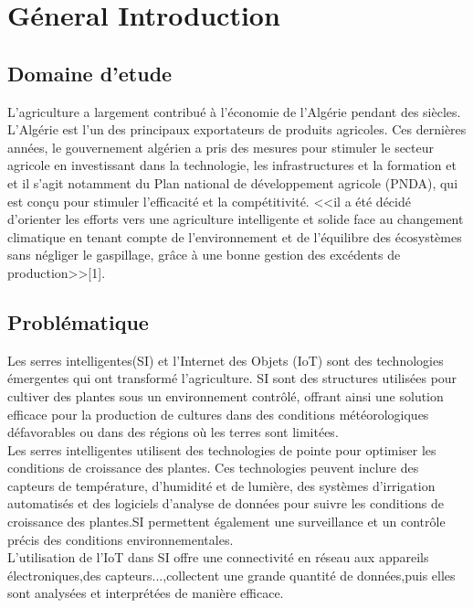 \chapter*{Géneral Introduction} 
\label{chap:introduction} 


\section*{Domaine d'etude}

L'agriculture a largement contribué à l'économie de l'Algérie pendant des siècles. L'Algérie est l'un des principaux exportateurs de produits agricoles.
Ces dernières années, le gouvernement algérien a pris des mesures pour stimuler le secteur agricole en investissant dans la technologie, les infrastructures et la formation et et il s'agit notamment du Plan national de développement agricole (PNDA), qui est conçu pour stimuler l'efficacité et la compétitivité. <<il a été décidé d’orienter les efforts vers une agriculture intelligente et solide face au changement climatique en tenant compte de l’environnement et de l’équilibre des écosystèmes sans négliger le gaspillage, grâce à une bonne gestion des excédents de production>>[1].


\section*{Problématique }
Les serres intelligentes(SI) et l'Internet des Objets (IoT) sont des technologies émergentes qui ont transformé l'agriculture. SI sont des structures utilisées pour cultiver des plantes sous un environnement contrôlé, offrant ainsi une solution efficace pour la production de cultures dans des conditions météorologiques défavorables ou dans des régions où les terres sont limitées.
\\
Les serres intelligentes utilisent des technologies de pointe pour optimiser les conditions de croissance des plantes. Ces technologies peuvent inclure des capteurs de température, d'humidité et de lumière, des systèmes d'irrigation automatisés et des logiciels d'analyse de données pour suivre les conditions de croissance des plantes.SI permettent également une surveillance et un contrôle précis des conditions environnementales.
\\
L'utilisation de l'IoT dans SI offre une connectivité en réseau aux appareils électroniques,des capteurs...,collectent une grande quantité de données,puis elles sont analysées et interprétées de manière efficace.
\\

